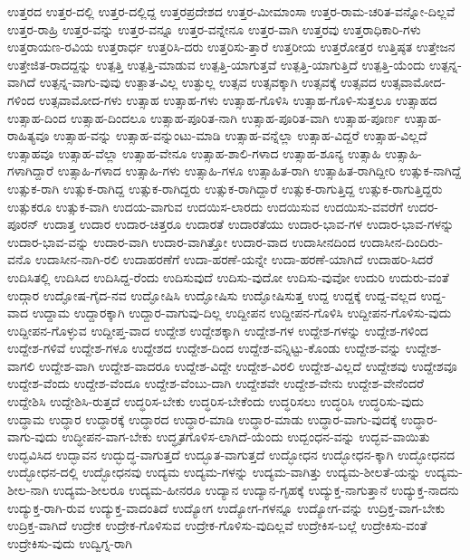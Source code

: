 {ಉತ್ತರದ
ಉತ್ತರ-ದಲ್ಲಿ
ಉತ್ತರ-ದಲ್ಲಿದ್ದ
ಉತ್ತರಪ್ರದೇಶದ
ಉತ್ತರ-ಮೀಮಾಂಸಾ
ಉತ್ತರ-ರಾಮ-ಚರಿತ-ವನ್ನೋ-ದಿಲ್ಲವೆ
ಉತ್ತರ-ರಾಹ್ರಿ
ಉತ್ತರ-ವನ್ನು
ಉತ್ತರ-ವನ್ನೂ
ಉತ್ತರ-ವನ್ನೇನೂ
ಉತ್ತರ-ವಾಗಿ
ಉತ್ತರವು
ಉತ್ತರಾಧಿಕಾರಿ-ಗಳು
ಉತ್ತರಾಯಣ-ರವಿಯ
ಉತ್ತರಾರ್ಧ
ಉತ್ತರಿಸಿ-ದರು
ಉತ್ತರಿಸು-ತ್ತಾರೆ
ಉತ್ತರೀಯ
ಉತ್ತರೋತ್ತರ
ಉತ್ತಿಷ್ಠತ
ಉತ್ತೇಜನ
ಉತ್ತೇಜಿತ-ರಾದದ್ದನ್ನು
ಉತ್ಪತ್ತಿ
ಉತ್ಪತ್ತಿ-ಮಾಡುವ
ಉತ್ಪತ್ತಿ-ಯಾಗುತ್ತವೆ
ಉತ್ಪತ್ತಿ-ಯಾಗುತ್ತಿದೆ
ಉತ್ಪತ್ತಿ-ಯೆಂದು
ಉತ್ಪನ್ನ-ವಾಗಿದೆ
ಉತ್ಪನ್ನ-ವಾಗು-ವುವು
ಉತ್ಪಾತ-ವಿಲ್ಲ
ಉತ್ಫುಲ್ಲ
ಉತ್ಸವ
ಉತ್ಸವಕ್ಕಾಗಿ
ಉತ್ಸವಕ್ಕೆ
ಉತ್ಸವದ
ಉತ್ಸವಾಮೋದ-ಗಳಿಂದ
ಉತ್ಸವಾಮೋದ-ಗಳು
ಉತ್ಸಾಹ
ಉತ್ಸಾಹ-ಗಳು
ಉತ್ಸಾಹ-ಗೊಳಿಸಿ
ಉತ್ಸಾಹ-ಗೊಳಿ-ಸುತ್ತಲೂ
ಉತ್ಸಾಹದ
ಉತ್ಸಾಹ-ದಿಂದ
ಉತ್ಸಾಹ-ದಿಂದಲೂ
ಉತ್ಸಾಹ-ಪೂರಿತ-ನಾಗಿ
ಉತ್ಸಾಹ-ಪೂರಿತ-ವಾಗಿ
ಉತ್ಸಾಹ-ಪೂರ್ಣ
ಉತ್ಸಾಹ-ರಾಹಿತ್ಯವೂ
ಉತ್ಸಾಹ-ವನ್ನು
ಉತ್ಸಾಹ-ವನ್ನುಂಟು-ಮಾಡಿ
ಉತ್ಸಾಹ-ವನ್ನೆಲ್ಲಾ
ಉತ್ಸಾಹ-ವಿದ್ದರೆ
ಉತ್ಸಾಹ-ವಿಲ್ಲದೆ
ಉತ್ಸಾಹವೂ
ಉತ್ಸಾಹ-ವೆಲ್ಲಾ
ಉತ್ಸಾಹ-ವೇನೂ
ಉತ್ಸಾಹ-ಶಾಲಿ-ಗಳಾದ
ಉತ್ಸಾಹ-ಶೂನ್ಯ
ಉತ್ಸಾಹಿ
ಉತ್ಸಾಹಿ-ಗಳಾಗಿದ್ದಾರೆ
ಉತ್ಸಾಹಿ-ಗಳಾದ
ಉತ್ಸಾಹಿ-ಗಳು
ಉತ್ಸಾಹಿ-ಗಳೂ
ಉತ್ಸಾಹಿತ-ರಾಗಿ
ಉತ್ಸಾಹಿತ-ರಾಗಿದ್ದೀರಿ
ಉತ್ಸುಕ-ನಾಗಿದ್ದೆ
ಉತ್ಸುಕ-ರಾಗಿ
ಉತ್ಸುಕ-ರಾಗಿದ್ದ
ಉತ್ಸುಕ-ರಾಗಿದ್ದರು
ಉತ್ಸುಕ-ರಾಗಿದ್ದಾರೆ
ಉತ್ಸುಕ-ರಾಗುತ್ತಿದ್ದ
ಉತ್ಸುಕ-ರಾಗುತ್ತಿದ್ದರು
ಉತ್ಸುಕರೂ
ಉತ್ಸುಕ-ವಾಗಿ
ಉದಯ-ವಾಗುವ
ಉದಯಿಸ-ಲಾರದು
ಉದಯಿಸುವ
ಉದಯಿಸು-ವವರೆಗೆ
ಉದರ-ಪೂರನ್
ಉದಾತ್ತ
ಉದಾರ
ಉದಾರ-ಚಿತ್ತರೂ
ಉದಾರತೆ
ಉದಾರತೆಯು
ಉದಾರ-ಭಾವ-ಗಳ
ಉದಾರ-ಭಾವ-ಗಳನ್ನು
ಉದಾರ-ಭಾವ-ವನ್ನು
ಉದಾರ-ವಾಗಿ
ಉದಾರ-ವಾಗಿತ್ತೋ
ಉದಾರ-ವಾದ
ಉದಾಸೀನದಿಂದ
ಉದಾಸೀನ-ದಿಂದಿರು-ವನೊ
ಉದಾಸೀನ-ನಾಗಿ-ರಲಿ
ಉದಾಹರಣೆಗೆ
ಉದಾ-ಹರಣೆ-ಯನ್ನೇ
ಉದಾ-ಹರಣೆ-ಯಾಗಿದೆ
ಉದಾಹರಿ-ಸಿದರೆ
ಉದಿಸಿತಲ್ಲಿ
ಉದಿಸಿದ
ಉದಿಸಿದ್ದ-ರೆಂದು
ಉದಿಸುವುದೆ
ಉದಿಸು-ವುದೋ
ಉದಿಸು-ವುವೋ
ಉದುರಿ
ಉದುರು-ವಂತೆ
ಉದ್ಗಾರ
ಉದ್ಘೋಷ-ಗೈದ-ನವ
ಉದ್ಘೋಷಿಸಿ
ಉದ್ಘೋಷಿಸು
ಉದ್ಘೋಷಿಸುತ್ತ
ಉದ್ದ
ಉದ್ದಕ್ಕೆ
ಉದ್ದ-ವಲ್ಲದ
ಉದ್ದ-ವಾದ
ಉದ್ದಾಮ
ಉದ್ದಾರಕ್ಕಾಗಿ
ಉದ್ದಾರ-ವಾಗುವು-ದಿಲ್ಲ
ಉದ್ದೀಪನ
ಉದ್ದೀಪನ-ಗೊಳಿಸಿ
ಉದ್ದೀಪನ-ಗೊಳಿಸು-ವುದು
ಉದ್ದೀಪನ-ಗೊಳ್ಳುವ
ಉದ್ದೀಪ್ತ-ವಾದ
ಉದ್ದೇಶ
ಉದ್ದೇಶಕ್ಕಾಗಿ
ಉದ್ದೇಶ-ಗಳ
ಉದ್ದೇಶ-ಗಳನ್ನು
ಉದ್ದೇಶ-ಗಳಿಂದ
ಉದ್ದೇಶ-ಗಳಿವೆ
ಉದ್ದೇಶ-ಗಳೂ
ಉದ್ದೇಶದ
ಉದ್ದೇಶ-ದಿಂದ
ಉದ್ದೇಶ-ವನ್ನಿಟ್ಟು-ಕೊಂಡು
ಉದ್ದೇಶ-ವನ್ನು
ಉದ್ದೇಶ-ವಾಗಲಿ
ಉದ್ದೇಶ-ವಾಗಿ
ಉದ್ದೇಶ-ವಾದರೂ
ಉದ್ದೇಶ-ವಿದ್ದೇ
ಉದ್ದೇಶ-ವಿರಲಿ
ಉದ್ದೇಶ-ವಿಲ್ಲದೆ
ಉದ್ದೇಶವು
ಉದ್ದೇಶವೂ
ಉದ್ದೇಶ-ವೆಂದು
ಉದ್ದೇಶ-ವೆಂದೂ
ಉದ್ದೇಶ-ವೆಂಬು-ದಾಗಿ
ಉದ್ದೇಶವೇ
ಉದ್ದೇಶ-ವೇನು
ಉದ್ದೇಶ-ವೇನೆಂದರೆ
ಉದ್ದೇಶಿಸಿ
ಉದ್ದೇಶಿಸಿ-ರುತ್ತದೆ
ಉದ್ಧರಿಸ-ಬೇಕು
ಉದ್ಧರಿಸ-ಬೇಕೆಂದು
ಉದ್ಧರಿಸಲು
ಉದ್ಧರಿಸಿ
ಉದ್ಧರಿಸು-ವುದು
ಉದ್ಧಾಮ
ಉದ್ಧಾರ
ಉದ್ಧಾರಕ್ಕೆ
ಉದ್ಧಾರದ
ಉದ್ಧಾರ-ಮಾಡಿ
ಉದ್ಧಾರ-ಮಾಡು
ಉದ್ಧಾರ-ವಾಗು-ವುದಕ್ಕೆ
ಉದ್ಧಾರ-ವಾಗು-ವುದು
ಉದ್ಧೀಪನ-ವಾಗ-ಬೇಕು
ಉದ್ಧೃತಗೊಳಿಸ-ಲಾಗಿದೆ-ಯೆಂದು
ಉದ್ಬಂಧನ-ವನ್ನು
ಉದ್ಭವ-ವಾಯಿತು
ಉದ್ಭವಿಸಿದ
ಉದ್ಭಾವನ
ಉದ್ಭುದ್ಧ-ವಾಗುತ್ತದೆ
ಉದ್ಭೂತ-ವಾಗುತ್ತದೆ
ಉದ್ಭೋಧನ
ಉದ್ಭೋಧನ-ಕ್ಕಾಗಿ
ಉದ್ಭೋಧನದ
ಉದ್ಭೋಧನ-ದಲ್ಲಿ
ಉದ್ಭೋಧನವು
ಉದ್ಯಮ
ಉದ್ಯಮ-ಗಳನ್ನು
ಉದ್ಯಮ-ವಾಗಿತ್ತು
ಉದ್ಯಮ-ಶೀಲತೆ-ಯನ್ನು
ಉದ್ಯಮ-ಶೀಲ-ನಾಗಿ
ಉದ್ಯಮ-ಶೀಲರೂ
ಉದ್ಯಮ-ಹೀನರೂ
ಉದ್ಯಾನ
ಉದ್ಯಾನ-ಗೃಹಕ್ಕೆ
ಉದ್ಯುಕ್ತ-ನಾಗುತ್ತಾನೆ
ಉದ್ಯುಕ್ತ-ನಾದನು
ಉದ್ಯುಕ್ತ-ರಾಗಿ-ರುವ
ಉದ್ಯುಕ್ತ-ವಾದಂತಿದೆ
ಉದ್ಯೋಗ
ಉದ್ಯೋಗ-ಗಳನ್ನೂ
ಉದ್ಯೋಗ-ವನ್ನು
ಉದ್ರಿಕ್ತ-ವಾಗ-ಬೇಕು
ಉದ್ರಿಕ್ತ-ವಾಗಿದೆ
ಉದ್ರೇಕ
ಉದ್ರೇಕ-ಗೊಳಿಸುವ
ಉದ್ರೇಕ-ಗೊಳಿಸು-ವುದಿಲ್ಲವೆ
ಉದ್ರೇಕಿಸ-ಬಲ್ಲೆ
ಉದ್ರೇಕಿಸು-ವಂತೆ
ಉದ್ರೇಕಿಸು-ವುದು
ಉದ್ವಿಗ್ನ-ರಾಗಿ
}
